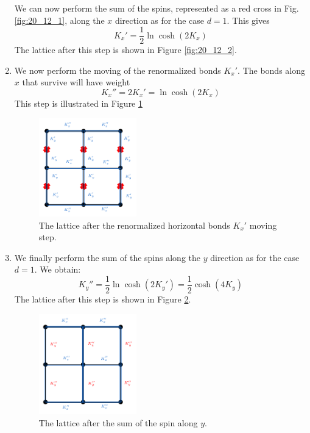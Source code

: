 \documentclass[../main/main.tex]{subfiles}
\begin{document}
\begin{enumerate}
 We can now perform the sum of the spins, represented as a red cross in Fig.\ref{fig:20_12_1}, along the \( x \) direction as for the case \( d=1 \).
This gives
\begin{equation*}
  K_x' = \frac{1}{2} \ln \cosh (2K_x)
\end{equation*}
The lattice after this step is shown in Figure \ref{fig:20_12_2}.

\item We now perform the moving of the renormalized bonds \( K_x' \).
The bonds along \( x \) that survive will have weight
\begin{equation*}
  K_x'' = 2 K_x' = \ln \cosh (2K_x)
\end{equation*}
This step is illustrated in Figure \ref{fig:20_13}

\begin{figure}[h!]
\centering
\includegraphics[width=0.4\textwidth]{../lessons/20_image/16.pdf}
\caption{\label{fig:20_13} The lattice after the renormalized horizontal bonds \( K_x' \)  moving step.}
\end{figure}



\item We finally perform the sum of the spins along the \( y \) direction as for the case \( d=1 \).
We obtain:
\begin{equation*}
  K_y'' = \frac{1}{2} \ln \cosh (2K_y') = \frac{1}{2} \cosh (4K_y)
\end{equation*}
The lattice after this step is shown in Figure \ref{fig:20_14}.

\begin{figure}[h!]
\centering
\includegraphics[width=0.4\textwidth]{../lessons/20_image/17.pdf}
\caption{\label{fig:20_14} The lattice after the sum of the spin along \( y \).}
\end{figure}

\end{enumerate}
\end{document}
